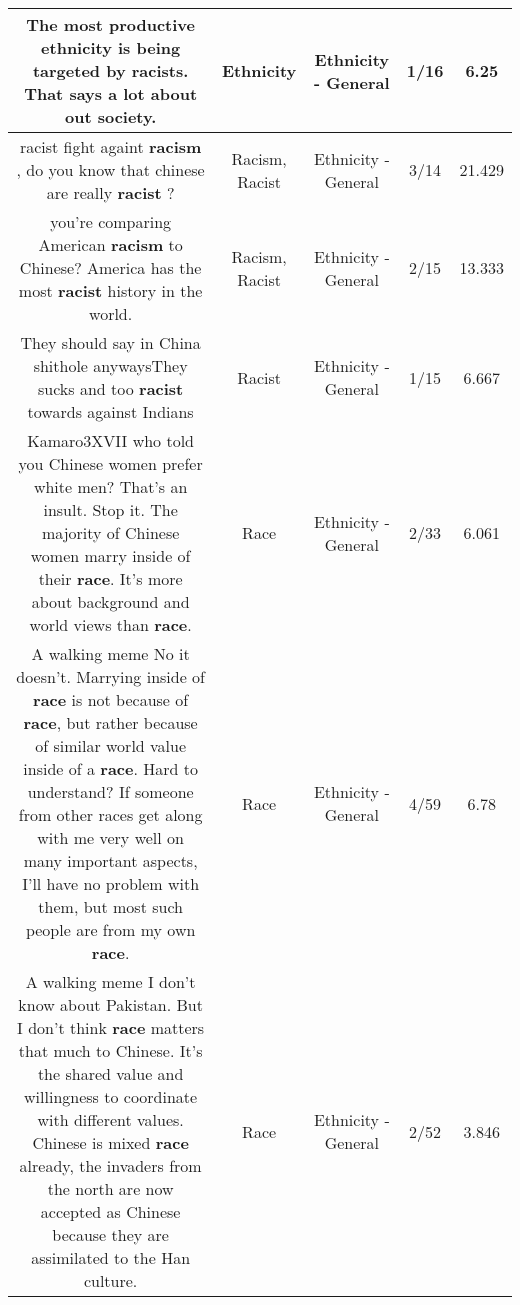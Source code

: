 \documentclass[11pt]{article}
\newlength\mylength
\begin{document}
\begin{center}
\begin{longtable}{|C{.65\mylength}|C{.30\mylength}|C{.12\mylength}|C{.12\mylength}|C{.12\mylength}|}
  \small The most productive \textbf{ethnicity} is being targeted by racists. That says a lot about out society.\normalsize   & Ethnicity & Ethnicity - General & 1/16 & 6.25 \\  \hline
  \small racist fight againt \textbf{racism} , do you know that chinese are really \textbf{racist} ?\normalsize   & Racism, Racist & Ethnicity - General & 3/14 & 21.429 \\  \hline
  \small you're comparing American \textbf{racism} to Chinese?  America has the most \textbf{racist} history in the world.\normalsize   & Racism, Racist & Ethnicity - General & 2/15 & 13.333 \\  \hline
  \small They should say in China shithole anywaysThey sucks and too \textbf{racist} towards against Indians\normalsize   & Racist & Ethnicity - General & 1/15 & 6.667 \\  \hline
  \small Kamaro3XVII who told you Chinese women prefer white men? That's an insult. Stop it. The majority of Chinese women marry inside of their \textbf{race}. It's more about background and world views than \textbf{race}.\normalsize   & Race & Ethnicity - General & 2/33 & 6.061 \\  \hline
  \small A walking meme No it doesn't. Marrying inside of \textbf{race} is not because of \textbf{race}, but rather because of similar world value inside of a \textbf{race}. Hard to understand? If someone from other races get along with me very well on many important aspects, I'll have no problem with them, but most such people are from my own \textbf{race}.\normalsize   & Race & Ethnicity - General & 4/59 & 6.78 \\  \hline
  \small A walking meme I don't know about Pakistan. But I don't think \textbf{race} matters that much to Chinese. It's the shared value and willingness to coordinate with different values. Chinese is mixed \textbf{race} already, the invaders from the north are now accepted as Chinese because they are assimilated to the Han culture.\normalsize   & Race & Ethnicity - General & 2/52 & 3.846 \\  \hline

\end{longtable}
\end{center}
\end{document}
